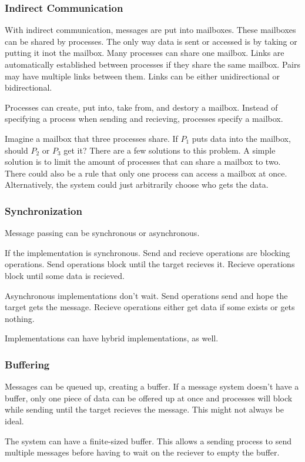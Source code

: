 \documentclass{article}
\begin{document}
\subsubsection{Indirect Communication}
With indirect communication, messages are put into mailboxes. These mailboxes
can be shared by processes. The only way data is sent or accessed is by taking
or putting it inot the mailbox. Many processes can share one mailbox. Links are
automatically established between processes if they share the same mailbox.
Pairs may have multiple links between them. Links can be either unidirectional
or bidirectional.

Processes can create, put into, take from, and destory a mailbox. Instead of
specifying a process when sending and recieving, processes specify a mailbox.

Imagine a mailbox that three processes share. If $P_1$ puts data into the
mailbox, should $P_2$ or $P_3$ get it? There are a few solutions to this
problem. A simple solution is to limit the amount of processes that can share
a mailbox to two. There could also be a rule that only one process can access
a mailbox at once. Alternatively, the system could just arbitrarily choose
who gets the data.

\subsubsection{Synchronization}
Message passing can be synchronous or asynchronous.

If the implementation is synchronous. Send and recieve operations are blocking
operations. Send operations block until the target recieves it. Recieve
operations block until some data is recieved.

Asynchronous implementations don't wait. Send operations send and hope the
target gets the message. Recieve operations either get data if some exists or
gets nothing.

Implementations can have hybrid implementations, as well.

\subsubsection{Buffering}
Messages can be queued up, creating a buffer. If a message system doesn't have
a buffer, only one piece of data can be offered up at once and processes will
block while sending until the target recieves the message. This might not
always be ideal.

The system can have a finite-sized buffer. This allows a sending process to
send multiple messages before having to wait on the reciever to empty the
buffer.
\end{document}
